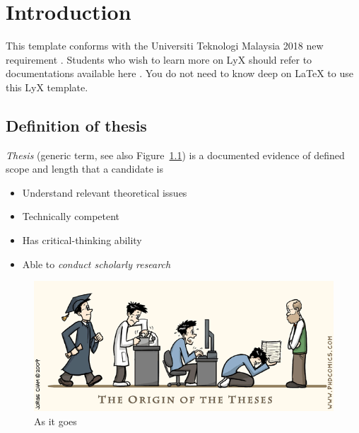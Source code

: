 \documentclass{utmthesis}
\begin{document}
\listofabbre
{}


\listofsymbols
{}


\listofappendices


\mainmatter


\chapter{Introduction}

This template conforms with the Universiti Teknologi Malaysia 2018 new requirement \cite{utm:thesis:manual}.
Students who wish to learn more on LyX should refer to documentations
available here \cite{lyx:download}. You do not need to know deep
on LaTeX \cite{latex:wikibook} to use this LyX template.

\section{Definition of thesis }

\noindent \emph{Thesis} (generic term, see also Figure~\ref{fig1})
is a documented evidence of defined scope and length that a candidate
is 
\begin{itemize}
\item Understand relevant theoretical issues
\item Technically competent
\item Has critical-thinking ability
\item Able to \emph{conduct scholarly research}
\end{itemize}
\begin{figure}[h]
\begin{centering}
\includegraphics[width=1\textwidth]{./figs/pasted13}
\par\end{centering}
\caption{As it goes}
\label{fig1}

\end{figure}
\end{document}
